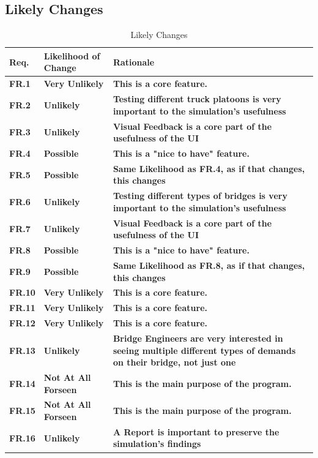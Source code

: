 \documentclass[12pt]{article}
\begin{document}
\subsection{Likely Changes}

\begin{table}[H]
  \caption{Likely Changes} \label{TblLikelyChanges}
  \begin{tabular}{p{}|p{}|p{}}
  \toprule
  \textbf{Req.} & \textbf{Likelihood of Change} & \textbf{Rationale}\\
  \midrule
  \textbf{FR.1} & \textbf{Very Unlikely} & \textbf{This is a core feature.}\\
  \midrule
  \textbf{FR.2} & \textbf{Unlikely} & \textbf{Testing different truck platoons is very important to the simulation's usefulness}\\
  \midrule
  \textbf{FR.3} & \textbf{Unlikely} & \textbf{Visual Feedback is a core part of the usefulness of the UI}\\
  \midrule
  \textbf{FR.4} & \textbf{Possible} & \textbf{This is a "nice to have" feature.}\\
  \midrule
  \textbf{FR.5} & \textbf{Possible} & \textbf{Same Likelihood as FR.4, as if that changes, this changes}\\
  \midrule
  \textbf{FR.6} & \textbf{Unlikely} & \textbf{Testing different types of bridges is very important to the simulation's usefulness}\\
  \midrule
  \textbf{FR.7} & \textbf{Unlikely} & \textbf{Visual Feedback is a core part of the usefulness of the UI}\\
  \midrule
  \textbf{FR.8} & \textbf{Possible} & \textbf{This is a "nice to have" feature.}\\
  \midrule
  \textbf{FR.9} & \textbf{Possible} & \textbf{Same Likelihood as FR.8, as if that changes, this changes}\\
  \midrule
  \textbf{FR.10} & \textbf{Very Unlikely} & \textbf{This is a core feature.}\\
  \midrule
  \textbf{FR.11} & \textbf{Very Unlikely} & \textbf{This is a core feature.}\\
  \midrule
  \textbf{FR.12} & \textbf{Very Unlikely} & \textbf{This is a core feature.}\\
  \midrule
  \textbf{FR.13} & \textbf{Unlikely} & \textbf{Bridge Engineers are very interested in seeing multiple different types of demands on their bridge, not just one}\\
  \midrule
  \textbf{FR.14} & \textbf{Not At All Forseen} & \textbf{This is the main purpose of the program.}\\
  \midrule
  \textbf{FR.15} & \textbf{Not At All Forseen} & \textbf{This is the main purpose of the program.}\\
  \midrule
  \textbf{FR.16} & \textbf{Unlikely} & \textbf{A Report is important to preserve the simulation's findings}\\
  \bottomrule
\end{tabular}
\end{table}
\end{document}
